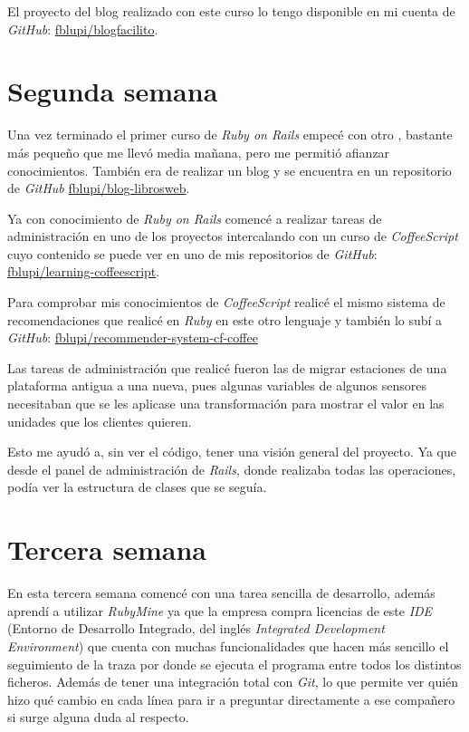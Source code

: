 El proyecto del blog realizado con este curso lo tengo disponible en mi cuenta de \textit{GitHub}: \href{https://github.com/fblupi/blogfacilito}{fblupi/blogfacilito}.

\section{Segunda semana}

Una vez terminado el primer curso de \textit{Ruby on Rails} empecé con otro \cite{librosweb-rails}, bastante más pequeño que me llevó media mañana, pero me permitió afianzar conocimientos. También era de realizar un blog y se encuentra en un repositorio de \textit{GitHub} \href{https://github.com/fblupi/blog-librosweb}{fblupi/blog-librosweb}.

Ya con conocimiento de \textit{Ruby on Rails} comencé a realizar tareas de administración en uno de los proyectos intercalando con un curso de \textit{CoffeeScript} \cite{youtube-coffee} cuyo contenido se puede ver en uno de mis repositorios de \textit{GitHub}: \href{https://github.com/fblupi/learning-coffeescript}{fblupi/learning-coffeescript}.

Para comprobar mis conocimientos de \textit{CoffeeScript} realicé el mismo sistema de recomendaciones que realicé en \textit{Ruby} en este otro lenguaje y también lo subí a \textit{GitHub}: \href{https://github.com/fblupi/recommender-system-cf-coffee}{fblupi/recommender-system-cf-coffee}

Las tareas de administración que realicé fueron las de migrar estaciones de una plataforma antigua a una nueva, pues algunas variables de algunos sensores necesitaban que se les aplicase una transformación para mostrar el valor en las unidades que los clientes quieren.

Esto me ayudó a, sin ver el código, tener una visión general del proyecto. Ya que desde el panel de administración de \textit{Rails}, donde realizaba todas las operaciones, podía ver la estructura de clases que se seguía.

\section{Tercera semana}

En esta tercera semana comencé con una tarea sencilla de desarrollo, además aprendí a utilizar \textit{RubyMine} ya que la empresa compra licencias de este \textit{IDE} (Entorno de Desarrollo Integrado, del inglés \textit{Integrated Development Environment}) que cuenta con muchas funcionalidades que hacen más sencillo el seguimiento de la traza por donde se ejecuta el programa entre todos los distintos ficheros. Además de tener una integración total con \textit{Git}, lo que permite ver quién hizo qué cambio en cada línea para ir a preguntar directamente a ese compañero si surge alguna duda al respecto.

